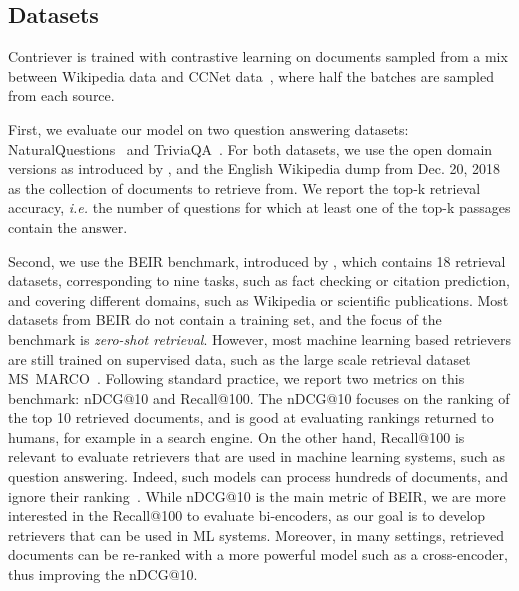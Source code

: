 \documentclass[10pt]{article} %
\begin{document}
\subsection{Datasets}

Contriever is trained with contrastive learning on documents sampled from a mix between Wikipedia data and CCNet data~\citep{wenzek-etal-2020-ccnet}, where half the batches are sampled from each source.

First, we evaluate our model on two question answering datasets: NaturalQuestions~\citep{kwiatkowski2019natural} and TriviaQA~\citep{JoshiTriviaQA2017}.
For both datasets, we use the open domain versions as introduced by \citet{lee2019latent}, and the English Wikipedia dump from Dec. 20, 2018 as the collection of documents to retrieve from.
We report the top-k retrieval accuracy, \emph{i.e.} the number of questions for which at least one of the top-k passages contain the answer.

Second, we use the BEIR benchmark, introduced by \citet{thakur2021beir}, which contains 18 retrieval datasets,
corresponding to nine tasks, such as fact checking or citation prediction, and covering different domains, such as Wikipedia or scientific publications.
Most datasets from BEIR do not contain a training set, and the focus of the benchmark is \emph{zero-shot retrieval}.
However, most machine learning based retrievers are still trained on supervised data, such as the large scale retrieval dataset MS~MARCO~\citep{bajaj2016ms}.
Following standard practice, we report two metrics on this benchmark: nDCG@10 and Recall@100.
The nDCG@10 focuses on the ranking of the top 10 retrieved documents, and is good at evaluating rankings returned to humans, for example in a search engine.
On the other hand, Recall@100 is relevant to evaluate retrievers that are used in machine learning systems, such as question answering.
Indeed, such models can process hundreds of documents, and ignore their ranking~\citep{izacard2020leveraging}.
While nDCG@10 is the main metric of BEIR, we are more interested in the Recall@100 to evaluate bi-encoders, as our goal is to develop retrievers that can be used in ML systems.
Moreover, in many settings, retrieved documents can be re-ranked with a more powerful model such as a cross-encoder, thus improving the nDCG@10.
\end{document}
